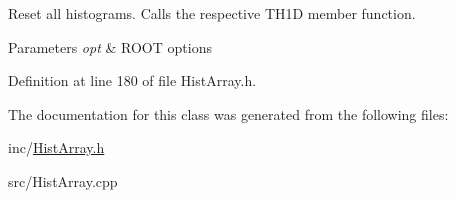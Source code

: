 Reset all histograms. Calls the respective T\+H1\+D member function. 


\begin{DoxyParams}{Parameters}
{\em opt} & R\+O\+O\+T options \\
\hline
\end{DoxyParams}


Definition at line 180 of file Hist\+Array.\+h.



The documentation for this class was generated from the following files\+:\begin{DoxyCompactItemize}
\item 
inc/\hyperlink{HistArray_8h}{Hist\+Array.\+h}\item 
src/Hist\+Array.\+cpp\end{DoxyCompactItemize}
